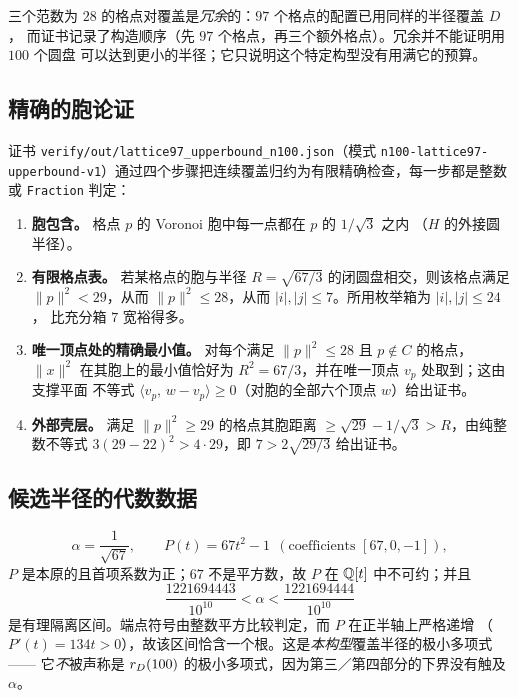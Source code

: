 \begin{remark}
三个范数为 $28$ 的格点对覆盖是\emph{冗余}的：$97$ 个格点的配置已用同样的半径覆盖 $D$，
而证书记录了构造顺序（先 $97$ 个格点，再三个额外格点）。冗余并不能证明用 $100$ 个圆盘
可以达到更小的半径；它只说明这个特定构型没有用满它的预算。
\end{remark}

\subsection{精确的胞论证}

证书 \texttt{verify/\allowbreak{}out/\allowbreak{}lattice97\_\allowbreak{}upperbound\_\allowbreak{}n100.json}（模式
\texttt{n100-\allowbreak{}lattice97-\allowbreak{}upperbound-\allowbreak{}v1}）通过四个步骤把连续覆盖归约为有限精确检查，每一步都是整数或
\texttt{Fraction} 判定：

\begin{enumerate}[leftmargin=1.6em,itemsep=3pt]
\item \textbf{胞包含。} 格点 $p$ 的 Voronoi 胞中每一点都在 $p$ 的 $1/\sqrt3$ 之内
（$H$ 的外接圆半径）。
\item \textbf{有限格点表。} 若某格点的胞与半径 $R=\sqrt{67/3}$ 的闭圆盘相交，则该格点满足
$\|p\|^2<29$，从而 $\|p\|^2\le28$，从而 $|i|,|j|\le7$。所用枚举箱为 $|i|,|j|\le24$，
比充分箱 $7$ 宽裕得多。
\item \textbf{唯一顶点处的精确最小值。} 对每个满足 $\|p\|^2\le28$ 且 $p\notin C$ 的格点，
$\|x\|^2$ 在其胞上的最小值恰好为 $R^2=67/3$，并在唯一顶点 $v_p$ 处取到；这由支撑平面
不等式 $\langle v_p,\,w-v_p\rangle\ge0$（对胞的全部六个顶点 $w$）给出证书。
\item \textbf{外部壳层。} 满足 $\|p\|^2\ge29$ 的格点其胞距离
$\ge\sqrt{29}-1/\sqrt3>R$，由纯整数不等式 $3(29-22)^2>4\cdot29$，即 $7>2\sqrt{29/3}$
给出证书。
\end{enumerate}

\subsection{候选半径的代数数据}

\[
\alpha=\frac1{\sqrt{67}},\qquad P(t)=67t^2-1 \ \ (\text{coefficients } [67,0,-1]),
\]
$P$ 是本原的且首项系数为正；$67$ 不是平方数，故 $P$ 在 $\mathbb{Q}[t]$ 中不可约；并且
\[
\frac{1221694443}{10^{10}}<\alpha<\frac{1221694444}{10^{10}}
\]
是有理隔离区间。端点符号由整数平方比较判定，而 $P$ 在正半轴上严格递增
（$P'(t)=134t>0$），故该区间恰含一个根。这是\emph{本构型}覆盖半径的极小多项式——
它\emph{不}被声称是 $r_{D}(100)$ 的极小多项式，因为第三／第四部分的下界没有触及
$\alpha$。

